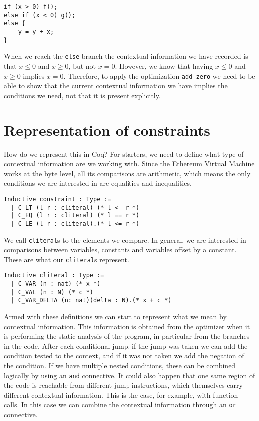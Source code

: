 \begin{verbatim}
if (x > 0) f();
else if (x < 0) g();
else {
    y = y + x;
}
\end{verbatim}

When we reach the \texttt{else} branch the contextual information we have recorded is that 
$x \le 0$ and $x \ge 0$, but not $x = 0$. However, we know that having $x \le 0$ and $x \ge 0$ implies 
$x = 0$. Therefore, to apply the optimization \texttt{add_zero} we need to be able to show 
that the current contextual information we have implies the conditions we need, not that it is present
explicitly.

\section{Representation of constraints}

How do we represent this in Coq? For starters, we need to define what type of contextual information
are we working with. Since the Ethereum Virtual Machine works at the byte level, all its comparisons
are arithmetic, which means the only conditions we are interested in are equalities and inequalities.

\begin{verbatim}
Inductive constraint : Type :=
  | C_LT (l r : cliteral) (* l <  r *)
  | C_EQ (l r : cliteral) (* l == r *)
  | C_LE (l r : cliteral).(* l <= r *)
\end{verbatim}

We call \texttt{cliteral}s to the elements we compare. In general, we are interested in 
comparisons between variables, constants and variables offset by a constant. These are what our 
\texttt{cliteral}s represent.

\begin{verbatim}
Inductive cliteral : Type :=
  | C_VAR (n : nat) (* x *)
  | C_VAL (n : N) (* c *)
  | C_VAR_DELTA (n: nat)(delta : N).(* x + c *)
\end{verbatim}

Armed with these definitions we can start to represent what we mean by contextual information. This 
information is obtained from the optimizer when it is performing the static analysis of the program, 
in particular from the branches in the code. After each conditional jump, if the jump was taken we 
can add the condition tested to the context, and if it was not taken we add the negation of the 
condition. If we have multiple nested conditions, these can be combined logically by using an 
\texttt{and} connective. It could also happen that one same region of the code is reachable 
from different jump instructions, which themselves carry different contextual information. This is the 
case, for example, with function calls. In this case we can combine the contextual information through 
an \texttt{or} connective. 

